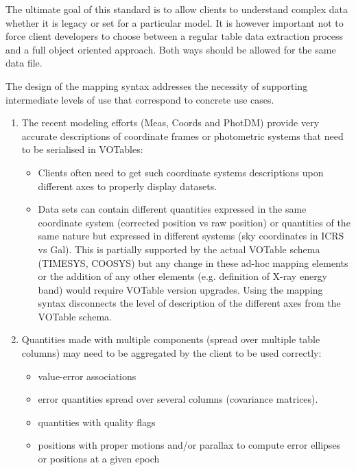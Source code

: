 
The ultimate goal of this standard is to allow clients to understand complex data whether it is legacy or set for a particular model. It is however important not to force client developers  to choose between a regular table data extraction process and a full object oriented approach. Both ways should be allowed for the same data file.

The design of the mapping syntax addresses the necessity of supporting intermediate levels of use that correspond to concrete use cases.

\begin{enumerate}
  \item The recent modeling efforts (Meas, Coords and PhotDM) provide very accurate descriptions of coordinate frames or photometric 
        systems that need to be serialised in VOTables:
  \begin{itemize}
    \item Clients often need to get such coordinate systems descriptions upon different axes to properly display datasets. 
    \item Data sets can contain different quantities expressed in the same coordinate system (corrected position vs raw position) or 
          quantities of the same nature but expressed in different systems (sky coordinates in ICRS vs Gal). 
          This is partially supported by the actual VOTable schema (TIMESYS, COOSYS) but any change in these ad-hoc mapping 
          elements or the addition of any other elements (e.g. definition of X-ray energy band) would require VOTable version upgrades. 
          Using the mapping syntax disconnects the level of description of the different axes from the VOTable schema.           
  \end{itemize} 
  
  \item Quantities made with multiple components (spread over multiple table columns) may need to be aggregated by the client to be used correctly:
  \begin{itemize}
    \item value-error associations
    \item error quantities spread over several columns (covariance matrices). 
    \item quantities with quality flags
    \item positions with proper motions and/or parallax to compute error ellipses or positions at a given epoch
  \end{itemize} 


\end{enumerate}
